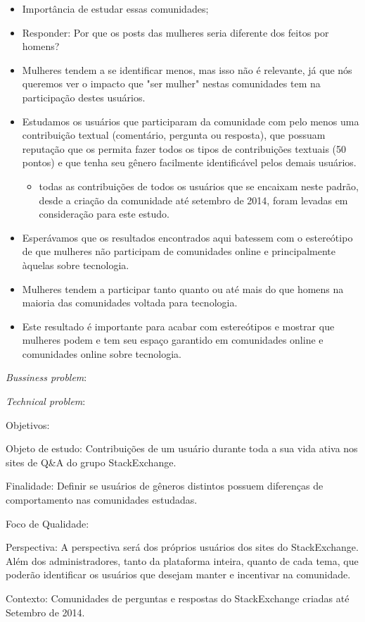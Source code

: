 \begin{itemize}
	\item Importância de estudar essas comunidades;
	\item Responder: Por que os posts das mulheres seria diferente dos feitos por homens?
	\item Mulheres tendem a se identificar menos, mas isso não é relevante, já que nós queremos ver o impacto que "ser mulher" nestas comunidades tem na participação destes usuários.
	\item Estudamos os usuários que participaram da comunidade com pelo menos uma contribuição textual (comentário, pergunta ou resposta), que possuam reputação que os permita fazer todos os tipos de contribuições textuais (50 pontos) e que tenha seu gênero facilmente identificável pelos demais usuários.
	\begin{itemize}
		\item todas as contribuições de todos os usuários que se encaixam neste padrão, desde a criação da comunidade até setembro de 2014, foram levadas em consideração para este estudo.
	\end{itemize}
	\item Esperávamos que os resultados encontrados aqui batessem com o estereótipo de que mulheres não participam de comunidades online e principalmente àquelas sobre tecnologia.
	\item Mulheres tendem a participar tanto quanto ou até mais do que homens na maioria das comunidades voltada para tecnologia. 
	\item Este resultado é importante para acabar com estereótipos e mostrar que mulheres podem e tem seu espaço garantido em comunidades online e comunidades online sobre tecnologia.
\end{itemize}

\emph{Bussiness problem}: 

\emph{Technical problem}: 

Objetivos: 

Objeto de estudo: Contribuições de um usuário durante toda a sua vida ativa nos sites de Q\&A do grupo StackExchange.

Finalidade: Definir se usuários de gêneros distintos possuem diferenças de comportamento nas comunidades estudadas.

Foco de Qualidade:

Perspectiva: A perspectiva será dos próprios usuários dos sites do StackExchange. Além dos administradores, tanto da plataforma inteira, quanto de cada tema, que poderão identificar os usuários que desejam manter e incentivar na comunidade.

Contexto: Comunidades de perguntas e respostas do StackExchange criadas até Setembro de 2014.